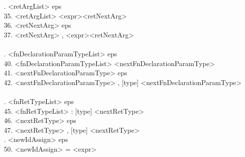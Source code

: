 \documentclass[a4paper, 12pt]{article}
\begin{document}
\begin{tabbing}
. \textless retArgList\textgreater                 \> \textrightarrow \>  eps \\
35. \textless retArgList\textgreater                 \> \textrightarrow \>  \textless expr\textgreater \textless retNextArg\textgreater \\
36. \textless retNextArg\textgreater                 \> \textrightarrow \>  eps \\
37. \textless retNextArg\textgreater                 \> \textrightarrow \>  , \textless expr\textgreater \textless retNextArg\textgreater \\ \\

. \textless fnDeclarationParamTypeList\textgreater \> \textrightarrow \>  eps \\
40. \textless fnDeclarationParamTypeList\textgreater \> \textrightarrow \>  [type] \textless nextFnDeclarationParamType\textgreater \\
41. \textless nextFnDeclarationParamType\textgreater \> \textrightarrow \>  eps \\
42. \textless nextFnDeclarationParamType\textgreater \> \textrightarrow \>  , [type] \textless nextFnDeclarationParamType\textgreater \\ \\

. \textless fnRetTypeList\textgreater              \> \textrightarrow \>  eps  \\
45. \textless fnRetTypeList\textgreater              \> \textrightarrow \>  : [type] \textless nextRetType\textgreater \\
46. \textless nextRetType\textgreater                \> \textrightarrow \>  eps \\
47. \textless nextRetType\textgreater                \> \textrightarrow \>  , [type] \textless nextRetType\textgreater \\

. \textless newIdAssign\textgreater                \> \textrightarrow \>  eps \\
50. \textless newIdAssign\textgreater                \> \textrightarrow \>  = \textless expr\textgreater \\ \\  
\end{tabbing}
\end{document}
